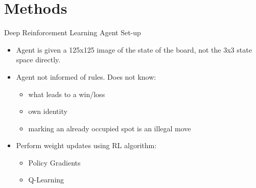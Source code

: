 \documentclass[11pt]{beamer}
\begin{document}
\section{Methods}
\begin{frame}{Deep Reinforcement Learning Agent Set-up}
	\begin{minipage}[t]{0.45\linewidth}
		\begin{itemize}
			\item Agent is given a 125x125 image of the state of the board, not the 3x3 state space directly.
			\item Agent not informed of rules. Does not know:
				\begin{itemize}
					\item what leads to a win/loss
					\item own identity
					\item marking an already occupied spot is an illegal move
				\end{itemize}
			\item Perform weight updates using RL algorithm:
			\begin{itemize}
				\item Policy Gradients
				\item Q-Learning
			\end{itemize}
		\end{itemize}
	\end{minipage}%
	\hfill
	\begin{minipage}[t]{0.45\linewidth}
		\centering
		\begin{figure}[tttDL]
			\centering

\end{figure}
\end{minipage}
\end{frame}
\end{document}
